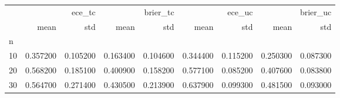\begin{tabular}{lrrrrrrrr}
\toprule
 & \multicolumn{2}{r}{ece_tc} & \multicolumn{2}{r}{brier_tc} & \multicolumn{2}{r}{ece_uc} & \multicolumn{2}{r}{brier_uc} \\
 & mean & std & mean & std & mean & std & mean & std \\
n &  &  &  &  &  &  &  &  \\
\midrule
10 & 0.357200 & 0.105200 & 0.163400 & 0.104600 & 0.344400 & 0.115200 & 0.250300 & 0.087300 \\
20 & 0.568200 & 0.185100 & 0.400900 & 0.158200 & 0.577100 & 0.085200 & 0.407600 & 0.083800 \\
30 & 0.564700 & 0.271400 & 0.430500 & 0.213900 & 0.637900 & 0.099300 & 0.481500 & 0.093000 \\
\bottomrule
\end{tabular}
